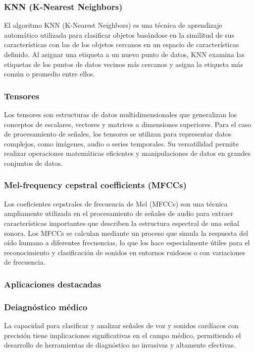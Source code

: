 \subsubsection*{KNN (K-Nearest Neighbors)}

El algoritmo KNN (K-Nearest Neighbors) es una técnica de aprendizaje automático utilizada para clasificar objetos basándose en la similitud de sus características con las de los objetos cercanos en un espacio de características definido. Al asignar una etiqueta a un nuevo punto de datos, KNN examina las etiquetas de los puntos de datos vecinos más cercanos y asigna la etiqueta más común o promedio entre ellos.

\subsubsection*{Tensores}

Los tensores son estructuras de datos multidimensionales que generalizan los conceptos de escalares, vectores y matrices a dimensiones superiores. Para el caso de procesamiento de señales, los tensores se utilizan para representar datos complejos, como imágenes, audio o series temporales. Su versatilidad permite realizar operaciones matemáticas eficientes y manipulaciones de datos en grandes conjuntos de datos.

\subsubsection*{Mel-frequency cepstral coefficients (MFCCs)}

Los coeficientes cepstrales de frecuencia de Mel (MFCCs) son una técnica ampliamente utilizada en el procesamiento de señales de audio para extraer características importantes que describen la estructura espectral de una señal sonora. Los MFCCs se calculan mediante un proceso que simula la respuesta del oído humano a diferentes frecuencias, lo que los hace especialmente útiles para el reconocimiento y clasificación de sonidos en entornos ruidosos o con variaciones de frecuencia.

\subsubsection*{Aplicaciones destacadas}
\subsubsection*{Deiagnóstico médico}
La capacidad para clasificar y analizar señales de voz y sonidos cardíacos con precisión tiene implicaciones significativas en el campo médico, permitiendo el desarrollo de herramientas de diagnóstico no invasivas y altamente efectivas.
